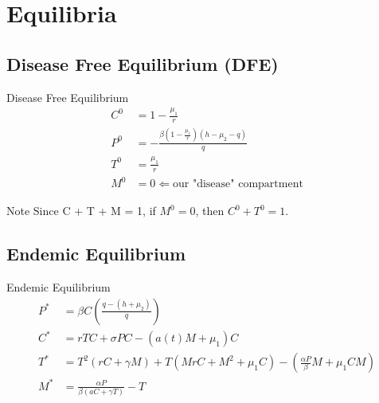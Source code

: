 \documentclass{beamer}
\begin{document}
\section{Equilibria}
\subsection{Disease Free Equilibrium (DFE)}
\begin{frame}{Disease Free Equilibrium}
    \begin{align*}
        C^{0} &= 1 - \frac{\mu_{1}}{r}\\
        P^{0} &= -\frac{\beta(1 - \frac{\mu_{1}}{r})(h - \mu_{2} - q)}{q}\\
        T^{0} &= \frac{\mu_{1}}{r}\\
        M^{0} &= 0 \Longleftarrow \text{our "disease" compartment}
    \end{align*}
    \begin{block}{Note}
    Since C + T + M = 1, if $M^{0} = 0$, then $C^{0} + T^{0} = 1$.
    \end{block}
\end{frame}



\subsection{Endemic Equilibrium}
\begin{frame}{Endemic Equilibrium}
    \begin{align*}
        P^{*} &= \beta C \left(\frac{q-(h+\mu_{2})}{q}\right)\\
        C^{*} &= rTC + \sigma PC - (a(t)M+\mu_{1})C\\
        T^{*} &= T^{2}(rC+\gamma M) + T(MrC + M^{2} + \mu_{1}C) - \left(\frac{\alpha P}{\beta}M + \mu_{1} CM\right)\\
        M^{*} &= \frac{\alpha P}{\beta (aC + \gamma T)} - T\\
    \end{align*}
        
\end{frame}
\end{document}
